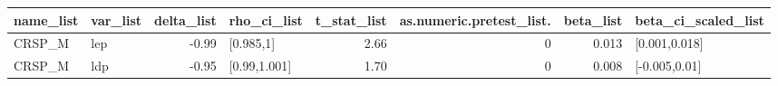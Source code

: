 \begin{table}[ht]
\centering
\begin{tabular}{llrlrrrl}
  \hline
name\_list & var\_list & delta\_list & rho\_ci\_list & t\_stat\_list & as.numeric.pretest\_list. & beta\_list & beta\_ci\_scaled\_list \\ 
  \hline
CRSP\_M & lep & -0.99 & [0.985,1] & 2.66 & 0 & 0.013 & [0.001,0.018] \\ 
  CRSP\_M & ldp & -0.95 & [0.99,1.001] & 1.70 & 0 & 0.008 & [-0.005,0.01] \\ 
   \hline
\end{tabular}
\end{table}
